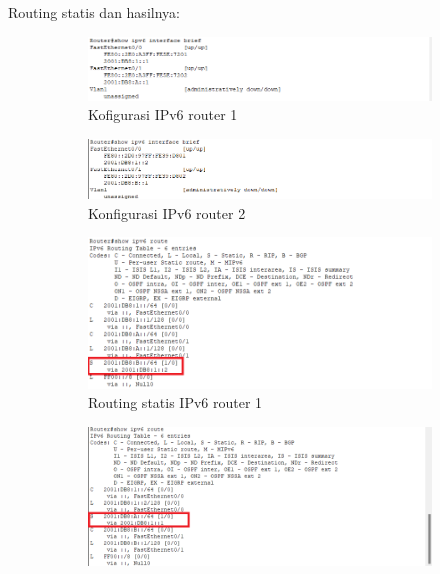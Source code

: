 Routing statis dan hasilnya:
\begin{figure}[H]
	\begin{subfigure}[b]{0.4\linewidth}
		\centering
		\includegraphics[width=\linewidth]{P2/img/tumod (9).png}
		\caption{Kofigurasi IPv6 router 1\label{fig:konfigurasiR1}}
	\end{subfigure}
	\begin{subfigure}[b]{0.4\linewidth}
		\centering
		\includegraphics[width=\linewidth]{P2/img/tumod (11).png}
		\caption{Konfigurasi IPv6 router 2\label{fig:konfigurasiR2}}
	\end{subfigure}
	\hspace{1cm}
	\begin{subfigure}[b]{0.4\linewidth}
		\centering
		\includegraphics[width=\linewidth]{P2/img/tumod (10).png}
		\caption{Routing statis IPv6 router 1\label{fig:routingR1}}
	\end{subfigure}
	\begin{subfigure}[b]{0.4\linewidth}
		\centering
		\includegraphics[width=\linewidth]{P2/img/tumod (1).png}

\end{subfigure}
\end{figure}
